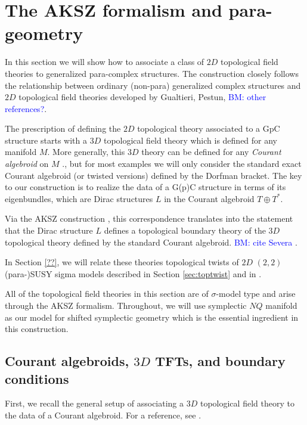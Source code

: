 \documentclass{article}
\newcommand{\TT}{{T\oplus T^*}}
\theoremstyle{definition}
\theoremstyle{remark}
\def\brian{\textcolor{blue}{BM: }\textcolor{blue}}
\begin{document}
 

\section{The AKSZ formalism and para-geometry}
\def\fg{\mathfrak{g}}
In this section we will show how to associate a class of $2D$ topological field theories to generalized para-complex structures.
The construction closely follows the relationship between ordinary (non-para) generalized complex structures and $2D$ topological field theories developed by Gualtieri, Pestun, \brian{other references?}.

The prescription of defining the $2D$ topological theory associated to a GpC structure starts with a $3D$ topological field theory which is defined for any manifold $M$. 
More generally, this $3D$ theory can be defined for any {\em Courant algebroid} on $M$ \cite{Roytenberg:2002nu}., but for most examples we will only consider the standard exact Courant algebroid (or twisted versions) defined by the Dorfman bracket.
The key to our construction is to realize the data of a G(p)C structure in terms of its eigenbundles, which are Dirac structures $L$ in the Courant algebroid $\TT$. 

Via the AKSZ construction \cite{AKSZ}, this correspondence translates into the statement that the Dirac structure $L$ defines a topological boundary theory of the $3D$ topological theory defined by the standard Courant algebroid.
\brian{cite Severa} \cite{SeveraTduality}. 

In Section \ref{??}, we will relate these theories topological twists of $2D$ $(2,2)$ (para-)SUSY sigma models described in Section \ref{sec:toptwist} and in \cite{Kapustin:2004gv}. 

All of the topological field theories in this section are of $\sigma$-model type and arise through the AKSZ formalism. 
Throughout, we will use symplectic $NQ$ manifold as our model for shifted symplectic geometry which is the essential ingredient in this construction. 


\subsection{Courant algebroids, $3D$ TFTs, and boundary conditions}
First, we recall the general setup of associating a $3D$ topological field theory to the data of a Courant algebroid. 
For a reference, see \cite{Roytenberg:2002nu,??}.
\end{document}
